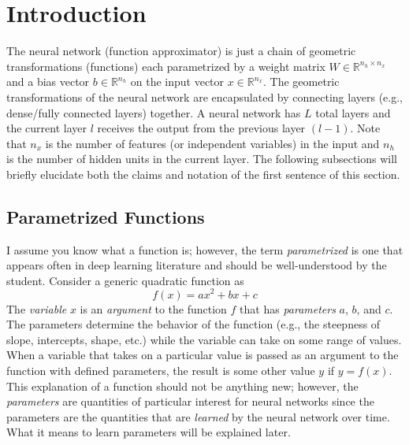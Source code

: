 \documentclass{article}
\begin{document}
\section{Introduction}

The neural network (function approximator) is just a chain of geometric transformations (functions)
each parametrized by a weight matrix $W \in \mathbb{R}^{n_h \times n_x}$ and
a bias vector $b \in \mathbb{R}^{n_h}$ on the input vector $x \in \mathbb{R}^{n_x}$.
The geometric transformations of the neural network are encapsulated by connecting
layers (e.g., dense/fully connected layers) together. A neural network has $L$ total
layers and the current layer $l$ receives the output from the previous layer $(l-1)$.
Note that $n_x$ is the number of features (or independent variables) in the input
and $n_h$ is the number of hidden units in the current layer. The following subsections will
briefly elucidate both the claims and notation of the first sentence of this section.

\subsection{Parametrized Functions}

I assume you know what a function is; however, the term \textit{parametrized}
is one that appears often in deep learning literature and should be well-understood by the student.
Consider a generic quadratic function \cite{MathSEVarsParamsArgs2015} as
\begin{equation}
	f(x) = ax^{2} + bx + c
\end{equation}
The \textit{variable} $x$ is an \textit{argument} to the function $f$ that has
\textit{parameters} $a$, $b$, and $c$. The parameters determine the behavior of
the function (e.g., the steepness of slope, intercepts, shape, etc.) while the
variable can take on some range of values. When a variable that takes on a particular
value is passed as an argument to the function with defined parameters, the result
is some other value $y$ if $y = f(x)$. This explanation of a function
should not be anything new; however, the \textit{parameters} are quantities
of particular interest for neural networks since the parameters are the quantities
that are \textit{learned} by the neural network over time. What it means to learn
parameters will be explained later.
\end{document}
